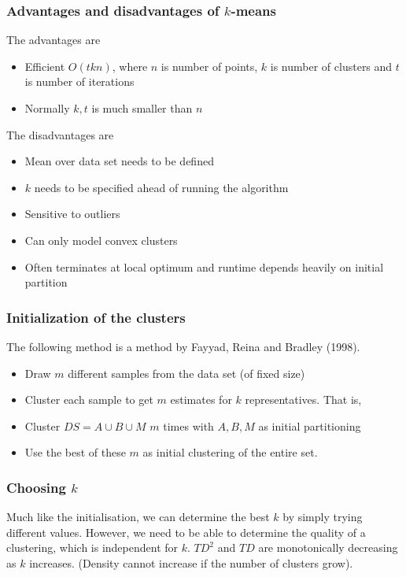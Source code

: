 \subsubsection{Advantages and disadvantages of $k$-means}
    The advantages are
    \begin{itemize}
        \item Efficient $O(tkn)$, where $n$ is number of points, $k$ is number of clusters and $t$ is number of iterations
        \item Normally $k, t$ is much smaller than $n$
    \end{itemize}
    The disadvantages are
    \begin{itemize}
        \item Mean over data set needs to be defined
        \item $k$ needs to be specified ahead of running the algorithm
        \item Sensitive to outliers
        \item Can only model convex clusters
        \item Often terminates at local optimum and runtime depends heavily on initial partition
    \end{itemize}

\subsubsection{Initialization of the clusters}
    The following method is a method by Fayyad, Reina and Bradley (1998). 
    \begin{itemize}
        \item Draw $m$ different samples from the data set (of fixed size)
        \item Cluster each sample to get $m$ estimates for $k$ representatives. That is, 
        \item Cluster $DS = A \cup B \cup M$ $m$ times with $A, B, M$ as initial partitioning
        \item Use the best of these $m$ as initial clustering of the entire set.
    \end{itemize}

\subsubsection{Choosing $k$}
    Much like the initialisation, we can determine the best $k$ by simply trying different values. However, we need to be able to determine the quality of a clustering, which is independent for $k$. $TD^2$ and $TD$ are monotonically decreasing as $k$ increases. (Density cannot increase if the number of clusters grow). 
    
